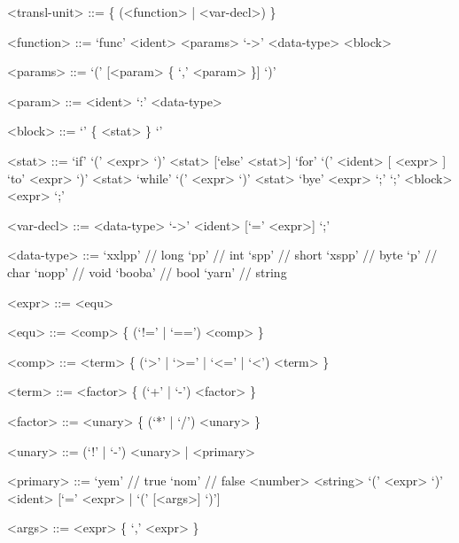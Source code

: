 \documentclass[12pt, a4paper]{article}
\begin{document}
    \setlength{\grammarparsep}{0.6em} %
    \setlength{\grammarindent}{10em} %

    \begin{grammar}

        <transl-unit> ::= \{ (<function> | <var-decl>) \}

        <function> ::= `func' <ident> <params> `->' <data-type> <block>

        <params> ::= `(' [<param> \{ `,' <param> \}] `)'

        <param> ::= <ident> `:' <data-type>

        <block> ::= `{' \{ <stat> \} `}'

        <stat> ::= `if' `(' <expr> `)' <stat> [`else' <stat>]
        \alt `for' `(' <ident> [ <expr> ] `to' <expr> `)' <stat>
        \alt `while' `(' <expr> `)' <stat>
        \alt `bye' <expr> `;'
        \alt `;'
        \alt <block>
        \alt <expr> `;'

        <var-decl> ::= <data-type> `->' <ident> [`=' <expr>] `;'

        <data-type> ::= `xxlpp' // long
        \alt `pp' // int
        \alt `spp' // short
        \alt `xspp' // byte
        \alt `p' // char
        \alt `nopp' // void
        \alt `booba' // bool
        \alt `yarn' // string

        <expr> ::= <equ>

        <equ> ::= <comp> \{ (`!=' | `==') <comp> \}

        <comp> ::= <term> \{ (`>' | `>=' | `<=' | `<') <term> \}

        <term> ::= <factor> \{ (`+' | `-') <factor> \}

        <factor> ::= <unary> \{ (`*' | `/') <unary> \}

        <unary> ::= (`!' | `-') <unary> | <primary>

        <primary> ::= `yem' // true
        \alt `nom' // false
        \alt <number>
        \alt <string>
        \alt `(' <expr> `)'
        \alt <ident> [`=' <expr> | `(' [<args>] `)']

        <args> ::= <expr> \{ `,' <expr> \}
    \end{grammar}
\end{document}

